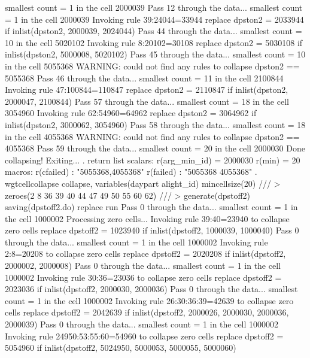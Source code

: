   smallest count = 1 in the cell      2000039
Pass 12 through the data...
  smallest count = 1 in the cell      2000039
  Invoking rule 39:24044=33944
  replace dpston2 = 2033944 if inlist(dpston2, 2000039, 2024044)
\smallskip
\oom
\smallskip
Pass 44 through the data...
  smallest count = 10 in the cell      5020102
  Invoking rule 8:20102=30108
  replace dpston2 = 5030108 if inlist(dpston2, 5000008, 5020102)
Pass 45 through the data...
  smallest count = 10 in the cell      5055368
  WARNING: could not find any rules to collapse dpston2 == 5055368
Pass 46 through the data...
  smallest count = 11 in the cell      2100844
  Invoking rule 47:100844=110847
  replace dpston2 = 2110847 if inlist(dpston2, 2000047, 2100844)
\smallskip
\oom
\smallskip
Pass 57 through the data...
  smallest count = 18 in the cell      3054960
  Invoking rule 62:54960=64962
  replace dpston2 = 3064962 if inlist(dpston2, 3000062, 3054960)
Pass 58 through the data...
  smallest count = 18 in the cell      4055368
  WARNING: could not find any rules to collapse dpston2 == 4055368
Pass 59 through the data...
  smallest count = 20 in the cell      2000030
  Done collapsing! Exiting...
{\smallskip}
. return list
{\smallskip}
scalars:
         r(arg_min_id) =  2000030
                r(min) =  20
{\smallskip}
macros:
            r(cfailed) : "5055368,4055368"
             r(failed) : "5055368 4055368"
{\smallskip}
. wgtcellcollapse collapse, variables(daypart alight_id) mincellsize(20) ///
>         zeroes(2 8 36 39 40 44 47 49 50 55 60 62) ///
>         generate(dpstoff2) saving(dpstoff2.do) replace run
Pass 0 through the data...
  smallest count = 1 in the cell      1000002
{\smallskip}
Processing zero cells...
{\smallskip}
  Invoking rule 39:40=23940 to collapse zero cells
  replace dpstoff2 = 1023940 if inlist(dpstoff2, 1000039, 1000040)
Pass 0 through the data...
  smallest count = 1 in the cell      1000002
  Invoking rule 2:8=20208 to collapse zero cells
  replace dpstoff2 = 2020208 if inlist(dpstoff2, 2000002, 2000008)
Pass 0 through the data...
  smallest count = 1 in the cell      1000002
  Invoking rule 30:36=23036 to collapse zero cells
  replace dpstoff2 = 2023036 if inlist(dpstoff2, 2000030, 2000036)
Pass 0 through the data...
  smallest count = 1 in the cell      1000002
  Invoking rule 26:30:36:39=42639 to collapse zero cells
  replace dpstoff2 = 2042639 if inlist(dpstoff2, 2000026, 2000030, 2000036, 2000039)
\smallskip
\oom
\smallskip
Pass 0 through the data...
  smallest count = 1 in the cell      1000002
  Invoking rule 24950:53:55:60=54960 to collapse zero cells
  replace dpstoff2 = 5054960 if inlist(dpstoff2, 5024950, 5000053, 5000055, 5000060)

